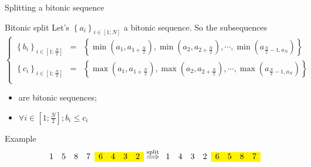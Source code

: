 \documentclass[compress,10pt,aspectratio=169]{beamer}
\begin{document}
\begin{frame}[fragile]{Splitting a bitonic sequence}
    \scriptsize

    \begin{exampleblock}{\small Bitonic split}
        Let's $\left\{a_{i}\right\}_{i\in\left[1;N\right]}$ a bitonic sequence. So the subsequences 
        \[
            \left\{
            \begin{array}{lcl}
                \left\{b_{i}\right\}_{i\in\left[1;\frac{N}{2}\right]} & = & \left\{\min(a_{1},a_{1+\frac{N}{2}}), \min(a_{2},a_{2+\frac{N}{2}}),\cdots, \min(a_{\frac{N}{2}-1,a_{N}})\right\}\\[2mm]
                \left\{c_{i}\right\}_{i\in\left[1;\frac{N}{2}\right]} & = & \left\{\max(a_{1},a_{1+\frac{N}{2}}), \max(a_{2},a_{2+\frac{N}{2}}),\cdots, \max(a_{\frac{N}{2}-1,a_{N}})\right\}\\
            \end{array}
            \right.
        \]
        \begin{itemize}
            \item are bitonic sequences;
            \item $\displaystyle \forall i\in\left[1;\frac{N}{2}\right]; b_{i} \leq c_{i}$
        \end{itemize}
    \end{exampleblock}

    \begin{block}{\small Example}
        \[
            \begin{array}{cccccccc}
                1 & 5 & 8 & 7 & \cellcolor{yellow}6 & \cellcolor{yellow}4 & \cellcolor{yellow}3 & \cellcolor{yellow}2
            \end{array}
            \stackrel{\mbox{\scriptsize split}}{\Longrightarrow}
            \begin{array}{cccccccc}
                1 & 4 & 3 & 2 & \cellcolor{yellow}6 & \cellcolor{yellow}5 & \cellcolor{yellow}8 & \cellcolor{yellow}7
            \end{array}
        \]
    \end{block}

\end{frame}
\end{document}
